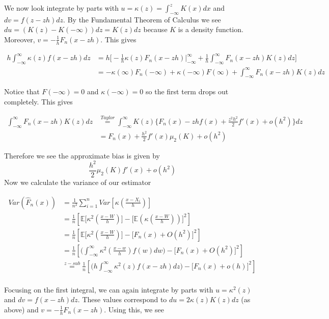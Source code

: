 \documentclass[12pt]{article}  %
\newcommand{\E}{{\mathbb{E}}}
\begin{document}
\begin{enumerate}
We now look integrate by parts with $u = \kappa(z)= \int_{-\infty}^zK(x)dx$ and $dv = f(z-zh)dz$. By the Fundamental Theorem of Calculus we see $du = (K(z) - K(-\infty))dz = K(z)dz$ because $K$ is a density function. Moreover, $v = -\frac{1}{h}F_n(x-zh)$. This gives 

\begin{align*}
h\int_{-\infty}^{\infty}\kappa(z)f(x-zh)dz &= h\bigg[-\frac{1}{h}\kappa(z)F_n(x-zh)\Big\vert_{-\infty}^{\infty} +\frac{1}{h} \int_{-\infty}^{\infty}F_n(x-zh)K(z)dz\bigg]\\
&=  -\kappa(\infty)F_n(-\infty) + \kappa(-\infty)F(\infty) +\int_{-\infty}^{\infty}F_n(x-zh)K(z)dz
\end{align*}

Notice that $F(-\infty) = 0$ and $\kappa(-\infty) = 0$ so the first term drops out completely. This gives 

\begin{align*}
\int_{-\infty}^{\infty}F_n(x-zh)K(z)dz &\overset{Taylor}{=}\int_{-\infty}^{\infty}K(z)\Big\{F_n(x) - zhf(x) + \frac{z^2h^2}{2}f'(x) + o(h^2)\Big\} dz\\
&= F_n(x) + \frac{h^2}{2}f'(x)\mu_2(K) + o(h^2)
\end{align*}

Therefore we see the approximate bias is given by $$\frac{h^2}{2}\mu_2(K)f'(x) +o(h^2)$$ Now we calculate the variance of our estimator 

\begin{align*}
Var(\hat{F}_n(x)) &= \frac{1}{n^2}\sum_{i=1}^{n}Var\left[\kappa\left(\frac{x - X_i}{h}\right)\right]\\
&= \frac{1}{n}\left[\E\bigg[\kappa^2\left(\frac{x-W}{h}\right)\bigg] - \bigg[\E\left(\kappa\left(\frac{x-W}{h}\right)\right)\bigg]^2\right]\\
&= \frac{1}{n}\left[\E\bigg[\kappa^2\left(\frac{x-W}{h}\right)\bigg] - \bigg[F_n(x) + O(h^2)\bigg]^2\right]\\
&= \frac{1}{n}\left[\bigg(\int_{-\infty}^{\infty}\kappa^2\left(\frac{x-w}{h}\right)f(w)dw\bigg) - \bigg[F_n(x) + O(h^2)\bigg]^2\right]\\
&\overset{z-sub}{=} \frac{1}{n}\left[\bigg(h\int_{-\infty}^{\infty}\kappa^2(z)f(x - zh)dz\bigg) - \bigg[F_n(x) + o(h)\bigg]^2\right]\\
\end{align*}

Focusing on the first integral, we can again integrate by parts with $u = \kappa^2(z)$ and $dv = f(x-zh)dz$. These values correspond to $du = 2\kappa(z)K(z)dz$ (as above) and $v = -\frac{1}{h}F_{n}(x-zh)$. Using this, we see 


\end{enumerate}
\end{document}
